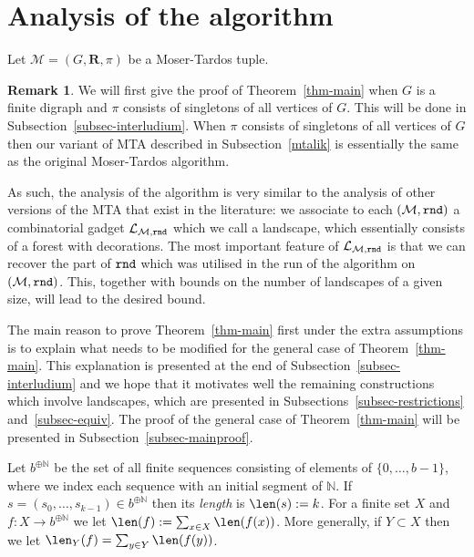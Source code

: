 \documentclass[12pt,a4paper]{article}
\numberwithin{equation}{section}
\theoremstyle{definition}
\newtheorem{remark}[equation]{Remark}
\newenvironment{myrem}{%
        \begin{mdframed}[%
            linewidth=4pt, 
            topline=false, 
            bottomline=false, 
            rightline=false,%
            leftmargin=0pt, 
            innerleftmargin=0.4em, 
            rightmargin=0pt, 
            innerrightmargin=0pt, 
            innertopmargin=0pt ,%
            innerbottommargin=0pt, 
            splittopskip=\topskip, 
            splitbottomskip=0.3\topskip, %
            ]%
        \begin{remark}
    }{%
        \end{remark}
        \end{mdframed}
    }
\newcommand\NN{\mathbb N}
\renewcommand{\cal}[1]{{\mathcal #1}}
\newcommand{\used}{\textsc{Used}}
\newcommand{\unused}{\textsc{Unused}}
\begin{document}
    
    
    
    
    \section{Analysis of the algorithm}\label{sec-analysis}
    
    Let $\cal M= (G,\mathbf R, \pi)$ be a Moser-Tardos tuple. 
    
    \begin{myrem} We will first give the proof of Theorem~\ref{thm-main} when $G$ is a finite digraph and $\pi$ consists of singletons of all vertices of $G$. This will be done in Subsection~\ref{subsec-interludium}.  When $\pi$ consists of singletons of all vertices of $G$ then our variant of MTA described in Subsection~\ref{mtalik} is essentially the same as the original Moser-Tardos algorithm.
    
     As such, the analysis of the algorithm is very similar to the analysis of other versions of the MTA that exist in the literature: we associate to each $(\cal M,\rnd)$  a combinatorial gadget $\cal L_{\cal M,\rnd}$ which we call a landscape, which essentially consists of a forest with decorations. The most important feature of $\cal L_{\cal M, \rnd}$ is that we can recover the part of $\normalfont{\texttt{rnd}}$ which was utilised in the run of the algorithm on $(\cal M, \rnd)$. This, together with bounds on the number of landscapes of a given size, will lead to the desired bound.
    
    The main reason to prove Theorem~\ref{thm-main} first under the extra assumptions is to explain what needs to be modified for the general case of Theorem~\ref{thm-main}. This explanation is presented at the end of Subsection~\ref{subsec-interludium} and we hope that it motivates well the remaining constructions which involve landscapes, which are presented in Subsections~\ref{subsec-restrictions} and~\ref{subsec-equiv}. The proof of the general case of Theorem~\ref{thm-main} will be presented in Subsection~\ref{subsec-mainproof}.
    \end{myrem}
    
     Let $b^{\oplus \NN}$ be the set of all finite sequences consisting of elements of $\{0,\dots,b-1\}$, where we index each sequence with an initial segment of $\NN$. If $s=(s_0,\ldots, 
     s_{k-1})\in b^{\oplus \NN}$ then its \emph{length} is $\len(s) :=k$. For a finite set $X$ and  
     $f\colon X \to b^{\oplus \NN}$ we let $\len(f):= \sum_{x\in X} 
     \len(f(x))$. More generally, if $Y\subset X$ then we let $\len_Y(f) = \sum_{y\in Y} \len(f(y))$.
    
\end{document}
